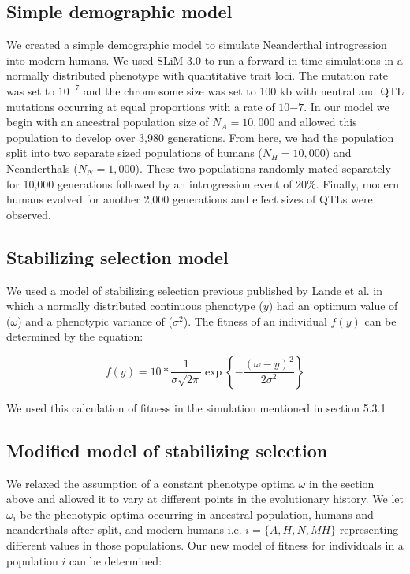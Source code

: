 \subsection{Simple demographic model}
We created a simple demographic model to simulate Neanderthal introgression into modern humans. We used SLiM 3.0 \cite{haller2019slim} to run a forward in time simulations in a normally distributed phenotype with quantitative trait loci. The mutation rate was set to $10^{-7}$ and the chromosome size was set to 100 kb with neutral and QTL mutations occurring at equal proportions with a rate of $10{-7}$. In our model we begin with an ancestral population size of $N_A = 10,000$ and allowed this population to develop over 3,980 generations. From here, we had the population split into two separate sized populations of humans ($N_H = 10,000$) and Neanderthals ($N_N = 1,000$). These two populations randomly mated separately for 10,000 generations followed by an introgression event of $20\%$. Finally, modern humans evolved for another 2,000 generations and effect sizes of QTLs were observed. 

\subsection{Stabilizing selection model}
We used a model of stabilizing selection previous published by Lande et al.\cite{lande1976natural} in which a normally distributed continuous phenotype ($y$) had an optimum value of ($\omega$) and a phenotypic variance of ($\sigma^2$). The fitness of an individual $f(y)$ can be determined by the equation:

$$f(y) = 10 * \frac{1}{\sigma\sqrt{2\pi}} \exp{\left\{ -\frac{(\omega-y)^2}{2\sigma^2}\right \}}$$

We used this calculation of fitness in the simulation mentioned in section 5.3.1

\subsection{Modified model of stabilizing selection}
We relaxed the assumption of a constant phenotype optima $\omega$ in the section above and allowed it to vary at different points in the evolutionary history. We let $\omega_i$ be the phenotypic optima occurring in ancestral population, humans and neanderthals after split, and modern humans i.e. $i=\{A,H,N,MH\}$ representing different values in those populations. Our new model of fitness for individuals in a population $i$ can be determined: 

